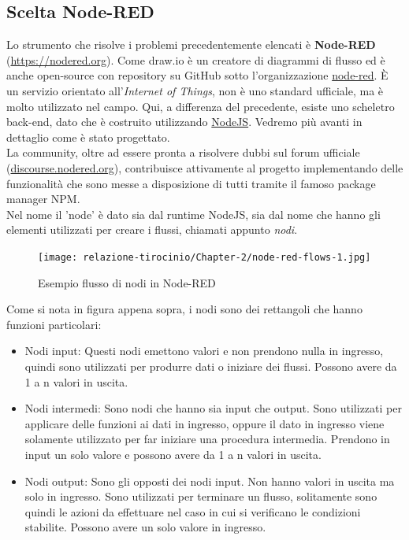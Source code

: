 \documentclass[a4paper,10pt]{memoir}
\begin{document}
\subsection{Scelta Node-RED}
Lo strumento che risolve i problemi precedentemente elencati è \textbf{Node-RED} (\href{https://nodered.org}{https://nodered.org}).
Come draw.io è un creatore di diagrammi di flusso ed è anche open-source con repository su GitHub sotto l'organizzazione \href{https://github.com/node-red}{node-red}. È un servizio orientato all'\textit{Internet of Things}, non è uno standard ufficiale, ma è molto utilizzato nel campo.
Qui, a differenza del precedente, esiste uno scheletro back-end, dato che è costruito utilizzando \href{https://nodejs.org}{NodeJS}. Vedremo più avanti in dettaglio come è stato progettato.\\
La community, oltre ad essere pronta a risolvere dubbi sul forum ufficiale (\href{https://discourse.nodered.org}{discourse.nodered.org}), contribuisce attivamente al progetto implementando delle funzionalità che sono messe a disposizione di tutti tramite il famoso package manager NPM.
\\
Nel nome il 'node' è dato sia dal runtime NodeJS, sia dal nome che hanno gli elementi utilizzati per creare i flussi, chiamati appunto \textit{nodi}.
\begin{figure}[H]
\caption{Esempio flusso di nodi in Node-RED}
\label{fig:node-red-flows-example1}
\texttt{[image: relazione-tirocinio/Chapter-2/node-red-flows-1.jpg]}
\end{figure}
Come si nota in figura appena sopra, i nodi sono dei rettangoli che hanno funzioni particolari:
\begin{itemize}
    \item Nodi input: Questi nodi emettono valori e non prendono nulla in ingresso, quindi sono utilizzati per produrre dati o iniziare dei flussi. Possono avere da 1 a n valori in uscita.
    \item Nodi intermedi: Sono nodi che hanno sia input che output. Sono utilizzati per applicare delle funzioni ai dati in ingresso, oppure il dato in ingresso viene solamente utilizzato per far iniziare una procedura intermedia. Prendono in input un solo valore e possono avere da 1 a n valori in uscita.
    \item Nodi output: Sono gli opposti dei nodi input. Non hanno valori in uscita ma solo in ingresso. Sono utilizzati per terminare un flusso, solitamente sono quindi le azioni da effettuare nel caso in cui si verificano le condizioni stabilite. Possono avere un solo valore in ingresso.
\end{itemize}
\end{document}
